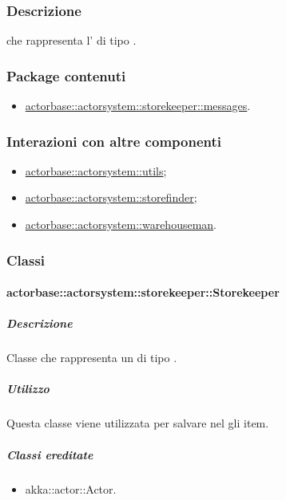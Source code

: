 \documentclass{scalatekids-article}
\begin{document}
\subsubsection{Descrizione}
 che rappresenta l' di tipo .

\subsubsection{Package contenuti}
\begin{itemize}
\item \hyperref[sec:actorbase::actorsystem::storekeeper::messages]{actorbase::actorsystem::storekeeper::messages}.
\end{itemize}

\subsubsection{Interazioni con altre componenti}
\begin{itemize}
\item \hyperref[sec:actorbase::actorsystem::utils]{actorbase::actorsystem::utils};
\item \hyperref[sec:actorbase::actorsystem::storefinder]{actorbase::actorsystem::storefinder};
\item \hyperref[sec:actorbase::actorsystem::warehouseman]{actorbase::actorsystem::warehouseman}.
\end{itemize}

\subsubsection{Classi}

\paragraph{actorbase::actorsystem::storekeeper::Storekeeper}
\label{sec:actorbase::actorsystem::storekeeper::Storekeeper}

\subparagraph{Descrizione}
Classe che rappresenta un  di tipo .

\subparagraph{Utilizzo}
Questa classe viene utilizzata per salvare nel  gli item.

\subparagraph{Classi ereditate}
\begin{itemize}
\item akka::actor::Actor.
\end{itemize}
\end{document}
